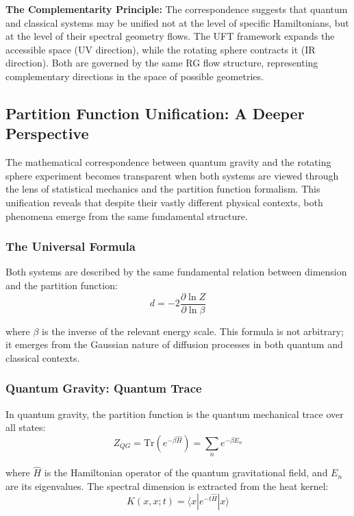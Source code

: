 \documentclass[UTF8]{ctex}\n\documentclass[12pt,a4paper]{article}
\begin{document}
\textbf{The Complementarity Principle:} The correspondence suggests that quantum and classical systems may be unified not at the level of specific Hamiltonians, but at the level of their spectral geometry flows. The UFT framework expands the accessible space (UV direction), while the rotating sphere contracts it (IR direction). Both are governed by the same RG flow structure, representing complementary directions in the space of possible geometries.

\subsection{Partition Function Unification: A Deeper Perspective}

The mathematical correspondence between quantum gravity and the rotating sphere experiment becomes transparent when both systems are viewed through the lens of statistical mechanics and the partition function formalism. This unification reveals that despite their vastly different physical contexts, both phenomena emerge from the same fundamental structure.

\subsubsection{The Universal Formula}

Both systems are described by the same fundamental relation between dimension and the partition function:
\begin{equation}
    d = -2 \frac{\partial \ln Z}{\partial \ln \beta}
    \label{eq:universal_dimension}
\end{equation}

where $\beta$ is the inverse of the relevant energy scale. This formula is not arbitrary; it emerges from the Gaussian nature of diffusion processes in both quantum and classical contexts.

\subsubsection{Quantum Gravity: Quantum Trace}

In quantum gravity, the partition function is the quantum mechanical trace over all states:
\begin{equation}
    Z_{QG} = \text{Tr}(e^{-\beta \hat{H}}) = \sum_n e^{-\beta E_n}
\end{equation}

where $\hat{H}$ is the Hamiltonian operator of the quantum gravitational field, and $E_n$ are its eigenvalues. The spectral dimension is extracted from the heat kernel:
\begin{equation}
    K(x,x;t) = \langle x | e^{-t\hat{H}} | x \rangle
\end{equation}
\end{document}
